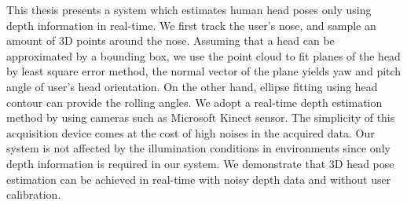 \begin{abstractEN}

This thesis presents a system which estimates human head poses only using depth information in real-time. 
We first track the user's nose, and sample an amount of 3D points around the nose. 
Assuming that a head can be approximated by a bounding box, 
we use the point cloud to fit planes of the head by least square error method, 
the normal vector of the plane yields yaw and pitch angle of user’s head orientation. 
On the other hand, ellipse fitting using head contour can provide the rolling angles. 
We adopt a real-time depth estimation method by using cameras such as Microsoft Kinect sensor. 
The simplicity of this acquisition device comes at the cost of high noises in the acquired data. 
Our system is not affected by the illumination conditions in environments since only depth information is required in our system. 
We demonstrate that 3D head pose estimation can be achieved in real-time with noisy depth data and without user calibration.

\end{abstractEN}

\begin{comment}



\keywords{Head Pose Estimation \and Depth Map \and Kinect \and Least Square Error Plane \and Calibration Free \and Nose Tracking}

\end{comment}
